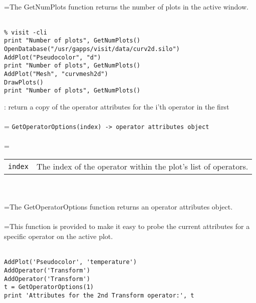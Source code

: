 \documentclass[10pt,a4paper]{report}
\begin{document}
 \\ 
\hangindent=\parindent The GetNumPlots function returns the number of plots in the active window. \\[-3mm] 

\\[-6mm]
\begin{verbatim}% visit -cli
print "Number of plots", GetNumPlots()
OpenDatabase("/usr/gapps/visit/data/curv2d.silo")
AddPlot("Pseudocolor", "d")
print "Number of plots", GetNumPlots()
AddPlot("Mesh", "curvmesh2d")
DrawPlots()
print "Number of plots", GetNumPlots()
\end{verbatim}
\newpage


{}
: return a copy of the operator attributes for the i'th operator in the first\\[-3mm]

 \\ 
\hangindent=\parindent 
\verb!GetOperatorOptions(index) -> operator attributes object!\\ [-3mm]

 \\ 
\hangindent=\parindent 
\begin{tabular}{lp{9cm}}
\verb!index! & The index of the operator within the plot's list of operators. \\
\end{tabular} \\[-2mm]


 \\ 
\hangindent=\parindent The GetOperatorOptions function returns an operator attributes object. \\[-3mm] 

 \\ 
\hangindent=\parindent This function is provided to make it easy to probe the current attributes for a specific operator on the active plot. \\[-3mm] 

\\[-6mm]
\begin{verbatim}AddPlot('Pseudocolor', 'temperature')
AddOperator('Transform')
AddOperator('Transform')
t = GetOperatorOptions(1)
print 'Attributes for the 2nd Transform operator:', t
\end{verbatim}
\newpage
\end{document}
